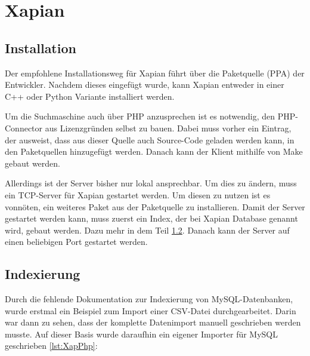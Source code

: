 
\section{Xapian}

\subsection{Installation}

Der empfohlene Installationsweg für Xapian führt über die Paketquelle (PPA) der Entwickler. Nachdem dieses eingefügt wurde, kann Xapian entweder in einer C++ oder Python Variante installiert werden. 

Um die Suchmaschine auch über PHP anzusprechen ist es notwendig, den PHP-Connector aus Lizenzgründen selbst zu bauen. Dabei muss vorher ein Eintrag, der ausweist, dass aus dieser Quelle auch Source-Code geladen werden kann, in den Paketquellen hinzugefügt werden. Danach kann der Klient mithilfe von Make gebaut werden.

Allerdings ist der Server bisher nur lokal ansprechbar. Um dies zu ändern, muss ein TCP-Server für Xapian gestartet werden. Um diesen zu nutzen ist es vonnöten, ein weiteres Paket aus der Paketquelle zu installieren. Damit der Server gestartet werden kann, muss zuerst ein Index, der bei Xapian Database genannt wird, gebaut werden. Dazu mehr in dem Teil \ref{xap:index}. Danach kann der Server auf einen beliebigen Port gestartet werden.

\subsection{Indexierung}
\label{xap:index}

Durch die fehlende Dokumentation zur Indexierung von MySQL-Datenbanken, wurde erstmal ein Beispiel zum Import einer CSV-Datei durchgearbeitet. Darin war dann zu sehen, dass der komplette Datenimport manuell geschrieben werden musste. Auf dieser Basis wurde daraufhin ein eigener Importer für MySQL geschrieben \ref{lst:XapPhp}:

